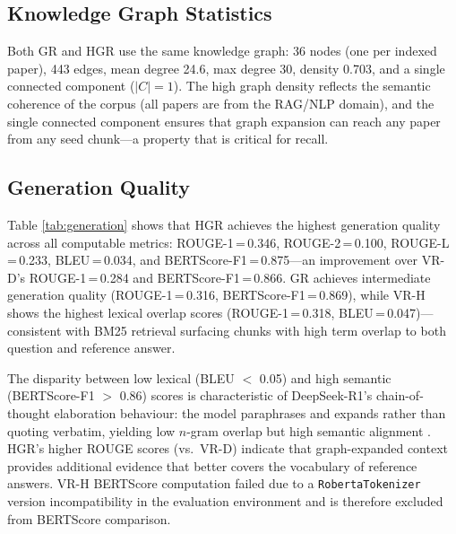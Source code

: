 \documentclass[conference,10pt,twocolumn]{IEEEtran}
\begin{document}
\subsection{Knowledge Graph Statistics}

Both GR and HGR use the same knowledge graph: 36 nodes (one per indexed paper), 443 edges, mean degree 24.6, max degree 30, density 0.703, and a single connected component ($|C|=1$). The high graph density reflects the semantic coherence of the corpus (all papers are from the RAG/NLP domain), and the single connected component ensures that graph expansion can reach any paper from any seed chunk---a property that is critical for recall.

\subsection{Generation Quality}

Table \ref{tab:generation} shows that HGR achieves the highest generation quality across all computable metrics: ROUGE-1\,=\,0.346, ROUGE-2\,=\,0.100, ROUGE-L\,=\,0.233, BLEU\,=\,0.034, and BERTScore-F1\,=\,0.875---an improvement over VR-D's ROUGE-1\,=\,0.284 and BERTScore-F1\,=\,0.866. GR achieves intermediate generation quality (ROUGE-1\,=\,0.316, BERTScore-F1\,=\,0.869), while VR-H shows the highest lexical overlap scores (ROUGE-1\,=\,0.318, BLEU\,=\,0.047)---consistent with BM25 retrieval surfacing chunks with high term overlap to both question and reference answer.

The disparity between low lexical (BLEU $<$ 0.05) and high semantic (BERTScore-F1 $>$ 0.86) scores is characteristic of DeepSeek-R1's chain-of-thought elaboration behaviour: the model paraphrases and expands rather than quoting verbatim, yielding low $n$-gram overlap but high semantic alignment \cite{zhang2020bertscore}. HGR's higher ROUGE scores (vs.\ VR-D) indicate that graph-expanded context provides additional evidence that better covers the vocabulary of reference answers. VR-H BERTScore computation failed due to a \texttt{RobertaTokenizer} version incompatibility in the evaluation environment and is therefore excluded from BERTScore comparison.
\end{document}
